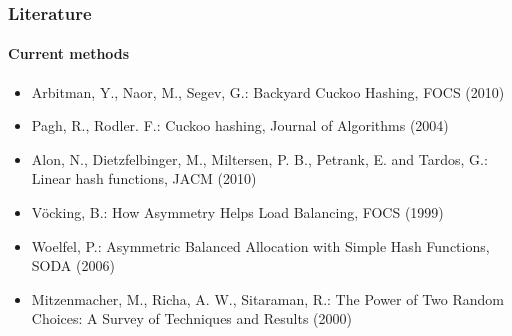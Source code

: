 \begin{frame}
	\frametitle{Literature}
	\framesubtitle{Current methods}

	\begin{itemize}
		\item Arbitman, Y., Naor, M., Segev, G.: Backyard Cuckoo Hashing, FOCS (2010)
		\item Pagh, R., Rodler. F.: Cuckoo hashing, Journal of Algorithms (2004)
		\item Alon, N., Dietzfelbinger, M., Miltersen, P. B., Petrank, E. and Tardos, G.: Linear hash functions, JACM (2010)
		\item Vöcking, B.: How Asymmetry Helps Load Balancing, FOCS (1999)
		\item Woelfel, P.: Asymmetric Balanced Allocation with Simple Hash Functions, SODA (2006)
		\item Mitzenmacher, M., Richa, A. W., Sitaraman, R.: The Power of Two Random Choices: A Survey of Techniques and Results (2000)
	\end{itemize}
\end{frame}
